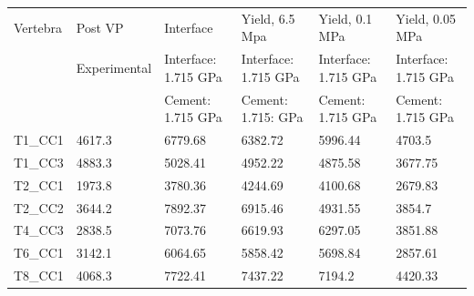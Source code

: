 \documentclass[11pt,a4paper]{article}
\begin{document}
\begin{landscape}

\begin{table}[]
\centering
\label{my-label}
\begin{tabular}{l|l|l|l|l|l}
   \hline
Vertebra & Post VP  & Interface                                                  & Yield, 6.5 Mpa                         & Yield, 0.1 MPa                         & Yield, 0.05 MPa                        \\
         &  Experimental                    & Interface: 1.715 GPa & Interface: 1.715 GPa & Interface: 1.715 GPa & Interface: 1.715 GPa\\
         & &  Cement: 1.715 GPa &  Cement: 1.715: GPa &  Cement: 1.715 GPa &  Cement: 1.715 GPa \\ \hline 
T1\_CC1  & 4617.3               & 6779.68                                                    & 6382.72                               & 5996.44                               & 4703.5                                \\
T1\_CC3  & 4883.3               & 5028.41                                                    & 4952.22                               & 4875.58                               & 3677.75                               \\
T2\_CC1  & 1973.8               & 3780.36                                                    & 4244.69                               & 4100.68                               & 2679.83                               \\
T2\_CC2  & 3644.2               & 7892.37                                                    & 6915.46                               & 4931.55                               & 3854.7                                \\
T4\_CC3  & 2838.5               & 7073.76                                                    & 6619.93                               & 6297.05                               & 3851.88                               \\
T6\_CC1  & 3142.1               & 6064.65                                                    & 5858.42                               & 5698.84                               & 2857.61                               \\
T8\_CC1  & 4068.3               & 7722.41                                                    & 7437.22                               & 7194.2                                & 4420.33                               \\

\end{tabular}
\end{table}
\end{landscape}
\end{document}
